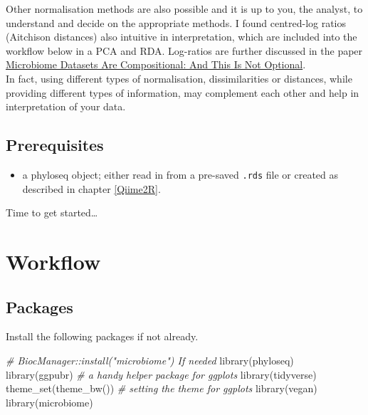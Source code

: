 \documentclass[
]{book}
\newenvironment{Shaded}{\begin{snugshade}}{\end{snugshade}}
\newcommand{\CommentTok}[1]{\textcolor[rgb]{0.56,0.35,0.01}{\textit{#1}}}
\newcommand{\FunctionTok}[1]{\textcolor[rgb]{0.00,0.00,0.00}{#1}}
\newcommand{\NormalTok}[1]{#1}
\providecommand{\tightlist}{%
  \setlength{\itemsep}{0pt}\setlength{\parskip}{0pt}}
\begin{document}
Other normalisation methods are also possible and it is up to you, the analyst, to understand and decide on the appropriate methods. I found centred-log ratios (Aitchison distances) also intuitive in interpretation, which are included into the workflow below in a PCA and RDA. Log-ratios are further discussed in the paper \href{https://doi.org/10.3389/fmicb.2017.02224}{Microbiome Datasets Are Compositional: And This Is Not Optional}.\\
In fact, using different types of normalisation, dissimilarities or distances, while providing different types of information, may complement each other and help in interpretation of your data.

\hypertarget{prerequisites}{%
\subsection{Prerequisites}\label{prerequisites}}

\begin{itemize}
\tightlist
\item
  a phyloseq object; either read in from a pre-saved \texttt{.rds} file or created as described in chapter \ref{Qiime2R}.
\end{itemize}

Time to get started\ldots{}

\hypertarget{workflow-3}{%
\section{Workflow}\label{workflow-3}}

\hypertarget{packages-1}{%
\subsection{Packages}\label{packages-1}}

Install the following packages if not already.

\begin{Shaded}
\begin{Highlighting}[]
\CommentTok{\# BiocManager::install("microbiome") If needed}
\FunctionTok{library}\NormalTok{(phyloseq)}
\FunctionTok{library}\NormalTok{(ggpubr)       }\CommentTok{\# a handy helper package for ggplots}
\FunctionTok{library}\NormalTok{(tidyverse)}
\FunctionTok{theme\_set}\NormalTok{(}\FunctionTok{theme\_bw}\NormalTok{())  }\CommentTok{\# setting the theme for ggplots}
\FunctionTok{library}\NormalTok{(vegan)}
\FunctionTok{library}\NormalTok{(microbiome)}
\end{Highlighting}
\end{Shaded}
\end{document}
